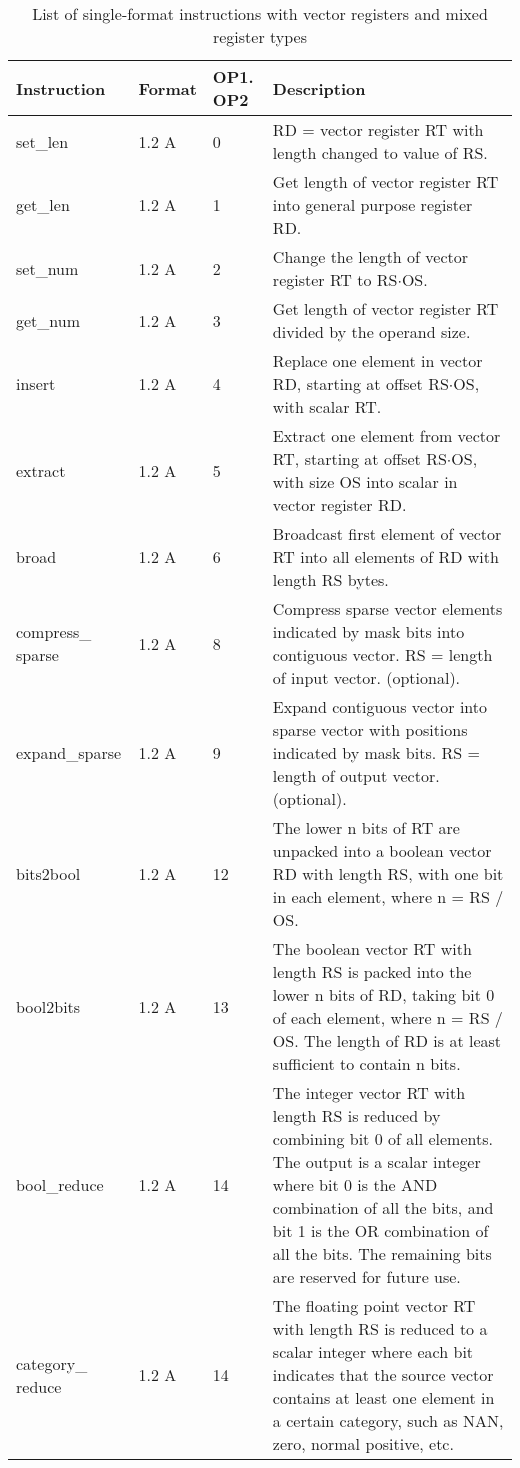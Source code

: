 \documentclass[forwardcom.tex]{subfiles}
\begin{document}
\begin{longtable} {|p{25mm}|p{14mm}|p{10mm}|p{95mm}|}
\caption{List of single-format instructions with vector registers and mixed register types} 
\label{table:ListOfSingleFormatInstructionsVector} \\
\endfirsthead
\endhead
\hline
\bfseries Instruction & \bfseries Format &\bfseries OP1. OP2 & \bfseries Description \\
\hline
set\_len      & 1.2 A &  0 & RD = vector register RT with length changed to value of RS. \\
get\_len      & 1.2 A &  1 & Get length of vector register RT into general purpose register RD. \\
set\_num      & 1.2 A &  2 & Change the length of vector register RT to RS$\cdot$OS. \\
get\_num      & 1.2 A &  3 & Get length of vector register RT divided by the operand size. \\

insert        & 1.2 A &  4 & Replace one element in vector RD, starting at offset RS$\cdot$OS, with scalar RT. \\

extract       & 1.2 A & 5 & Extract one element from vector RT, starting at offset RS$\cdot$OS, with size OS into scalar in vector register RD. \\

broad         & 1.2 A & 6 & Broadcast first element of vector RT into all elements of RD with length RS bytes. \\

compress\_ sparse& 1.2 A &  8 & Compress sparse vector elements indicated by mask bits into contiguous vector. RS = length of input vector. (optional). \\
expand\_sparse& 1.2 A & 9 & Expand contiguous vector into sparse vector with positions indicated by mask bits. RS = length of output vector. (optional). \\

bits2bool     & 1.2 A & 12 & The lower n bits of RT are unpacked into a boolean vector RD with length RS, with one bit in each element, where n = RS / OS. \\
bool2bits     & 1.2 A & 13 & The boolean vector RT with length RS is packed into the lower n bits of RD, taking bit 0 of each element, where n = RS / OS. The
length of RD is at least sufficient to contain n bits. \\
bool\_reduce  & 1.2 A & 14 & The integer vector RT with length RS is reduced by combining bit 0 of all elements. The output is a scalar integer where bit 0 is the
AND combination of all the bits, and bit 1 is the OR combination of
all the bits. The remaining bits are reserved for future use. \\
category\_ reduce & 1.2 A & 14 & The floating point vector RT with length RS is reduced to a scalar integer where each bit indicates that the source vector contains at least one element in a certain category, such as NAN, zero, normal positive, etc. \\


\end{longtable}
\end{document}
